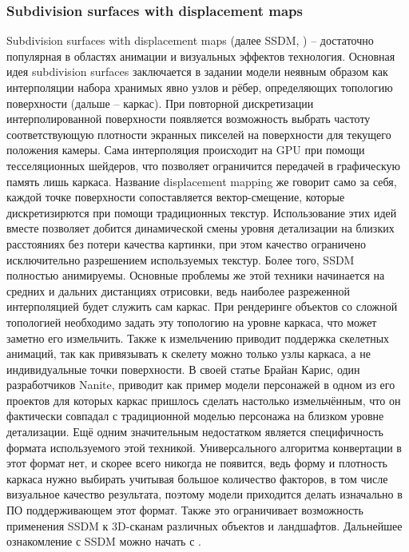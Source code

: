 \subsubsection{Subdivision surfaces with displacement maps}
Subdivision surfaces with displacement maps (далее SSDM, \cite{ssdm}) -- достаточно популярная в областях анимации и визуальных эффектов технология. Основная идея subdivision surfaces заключается в задании модели неявным образом как интерполяции набора хранимых явно узлов и рёбер, определяющих топологию поверхности (дальше -- каркас). При повторной дискретизации интерполированной поверхности появляется возможность выбрать частоту соответствующую плотности экранных пикселей на поверхности для текущего положения камеры. Сама интерполяция происходит на GPU при помощи тесселяционных шейдеров, что позволяет ограничится передачей в графическую память лишь каркаса. Название displacement mapping же говорит само за себя, каждой точке поверхности сопоставляется вектор-смещение, которые дискретизирются при помощи традиционных текстур. Использование этих идей вместе позволяет добится динамической смены уровня детализации на близких расстояниях без потери качества картинки, при этом качество ограничено исключительно разрешением используемых текстур. Более того, SSDM полностью анимируемы. Основные проблемы же этой техники начинается на средних и дальних дистанциях отрисовки, ведь наиболее разреженной интерполяцией будет служить сам каркас. При рендеринге объектов со сложной топологией необходимо задать эту топологию на уровне каркаса, что может заметно его измельчить. Также к измельчению приводит поддержка скелетных анимаций, так как привязывать к скелету можно только узлы каркаса, а не индивидуальные точки поверхности. В своей статье \cite{graphicrants_moregeometry} Брайан Карис, один разработчиков Nanite, приводит как пример модели персонажей в одном из его проектов для которых каркас пришлось сделать настолько измельчённым, что он фактически совпадал с традиционной моделью персонажа на близком уровне детализации. Ещё одним значительным недостатком является специфичность формата используемого этой техникой. Универсального алгоритма конвертации в этот формат нет, и скорее всего никогда не появится, ведь форму и плотность каркаса нужно выбирать учитывая большое количество факторов, в том числе визуальное качество результата, поэтому модели приходится делать изначально в ПО поддерживающем этот формат. Также это ограничивает возможность применения SSDM к 3D-сканам различных объектов и ландшафтов. Дальнейшее ознакомление с SSDM можно начать с \cite{ref}.

